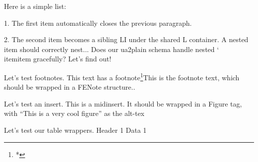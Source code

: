 Here is a simple list:
\beginlist
\item{1.} The first item automatically closes the previous paragraph.
\item{2.} The second item becomes a sibling LI under the shared L container.
 A nested item should correctly nest... 
Does our ua2plain schema handle nested \char`\\itemitem gracefully? Let's find out!
\endlist

Let's test footnotes. This text has a footnote\footnote{*}{This is the footnote text, which should be wrapped in a FENote structure.}.

Let's test an insert.
This is a midinsert. It should be wrapped in a Figure tag, with ``This is a very cool figure'' as the alt-tex
\endinsert

Let's test our table wrappers.
\begintable
\beginTH
Header 1
\endTH
\beginTR
\beginTD
Data 1
\endTD
\endTR
\endtable

\bye
